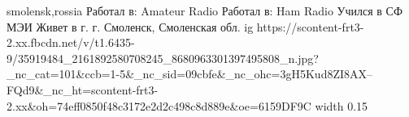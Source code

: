  
 
 
 
 

\par
smolensk,rossia
Работал в: Amateur Radio
Работал в: Ham Radio
Учился в СФ МЭИ
Живет в г. г. Смоленск, Смоленская обл.
\ifcmt
  ig https://scontent-frt3-2.xx.fbcdn.net/v/t1.6435-9/35919484_2161892580708245_8680963301397495808_n.jpg?_nc_cat=101&ccb=1-5&_nc_sid=09cbfe&_nc_ohc=3gH5Kud8ZI8AX--FQd9&_nc_ht=scontent-frt3-2.xx&oh=74eff0850f48c3172e2d2c498c8d889e&oe=6159DF9C
  width 0.15
\fi

